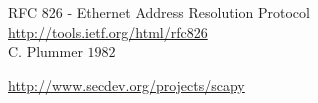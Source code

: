 \documentclass[%
	final, %
	notitlepage,
	narroweqnarray,
	inline,
	twoside,
	]{ieee}
\begin{document}
\begin{thebibliography}{1}


RFC 826 - Ethernet Address Resolution Protocol\\
\url{http://tools.ietf.org/html/rfc826}\\
\newblock C. Plummer $1982$




\url{http://www.secdev.org/projects/scapy}


\end{thebibliography}
\end{document}
